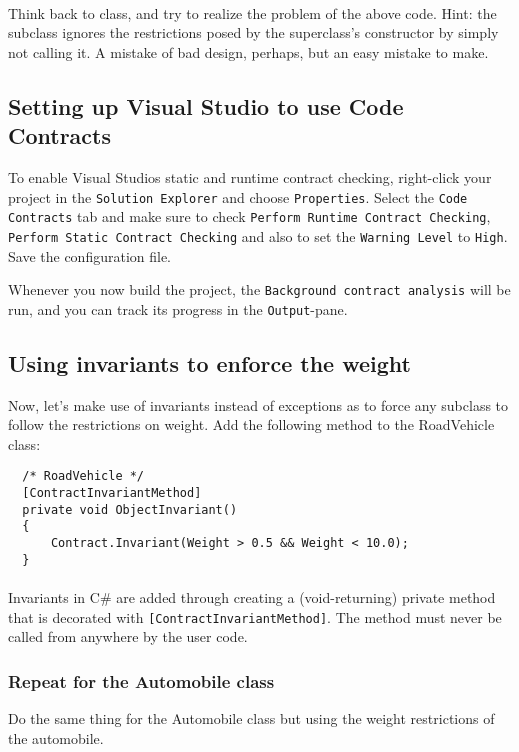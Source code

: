 \documentclass{article}
\begin{document}
    \paragraph{}
      Think back to class, and try to realize the problem of the above code. Hint: the subclass ignores the restrictions posed by the superclass's constructor by simply not calling it. A mistake of bad design, perhaps, but an easy mistake to make.

  \subsection{ Setting up Visual Studio to use Code Contracts }
    To enable Visual Studios static and runtime contract checking, right-click your project in the \texttt{Solution Explorer} and choose \texttt{Properties}. Select the \texttt{Code Contracts} tab  and make sure to check \texttt{Perform Runtime Contract Checking}, \texttt{Perform Static Contract Checking} and also to set the \texttt{Warning Level} to \texttt{High}. Save the configuration file.

    Whenever you now build the project, the \texttt{Background contract analysis} will be run, and you can track its progress in the \texttt{Output}-pane.


  \subsection{ Using invariants to enforce the weight }
      Now, let's make use of invariants instead of exceptions as to force any subclass to follow the restrictions on weight. Add the following method to the RoadVehicle class:
      \begin{lstlisting}
  /* RoadVehicle */
  [ContractInvariantMethod]
  private void ObjectInvariant()
  {
      Contract.Invariant(Weight > 0.5 && Weight < 10.0);
  }
      \end{lstlisting}

    \paragraph{}
    Invariants in C\# are added through creating a (void-returning) private method that is decorated with \texttt{[ContractInvariantMethod]}. The method must never be called from anywhere by the user code.

    \subsubsection{Repeat for the Automobile class}
    Do the same thing for the Automobile class but using the weight restrictions of the automobile.
    
\end{document}
